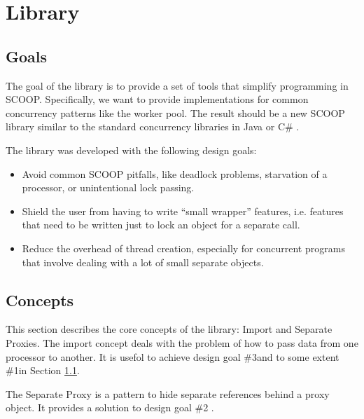 \documentclass[a4paper,10pt]{article}
\newcommand{\todoref}{\todo{ref}}
\begin{document}
\section {Library}
\label{sec:library}

 
\subsection{Goals}
\label{sec:goals}

The goal of the library is to provide a set of tools that simplify programming in SCOOP.
Specifically, we want to provide implementations for common concurrency patterns like the worker pool.
The result should be a new SCOOP library similar to the standard concurrency libraries in Java \todoref or C\# \todoref.

The library was developed with the following design goals:

\begin{itemize}
 \item Avoid common SCOOP pitfalls, like deadlock problems, starvation of a processor, or unintentional lock passing.
 \item Shield the user from having to write ``small wrapper'' features, i.e. features that need to be written just to lock an object for a separate call.
 \item Reduce the overhead of thread creation, especially for concurrent programs that involve dealing with a lot of small separate objects.
\end{itemize}

\subsection{Concepts}

This section describes the core concepts of the library: Import and Separate Proxies.
The import concept deals with the problem of how to pass data from one processor to another.
It is usefol to achieve design goal \#3\todoref and to some extent \#1\todoref in Section \ref{sec:goals}.

The Separate Proxy is a pattern to hide separate references behind a proxy object.
It provides a solution to design goal \#2 \todoref.
\end{document}
